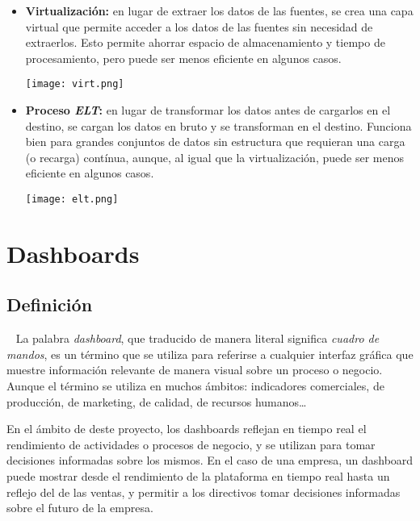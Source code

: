 \begin{itemize}
	\item \textbf{Virtualización:} en lugar de extraer los datos de las fuentes, se crea una capa virtual que
		permite acceder a los datos de las fuentes sin necesidad de extraerlos. Esto permite ahorrar espacio de
		almacenamiento y tiempo de procesamiento, pero puede ser menos eficiente en algunos casos.

		\begin{minipage}{0.9\linewidth}
			\texttt{[image: virt.png]}
		\end{minipage}
	\item \textbf{Proceso \textit{ELT}:} en lugar de transformar los datos antes de cargarlos en el destino,
		se cargan los datos en bruto y se transforman en el destino. Funciona bien para grandes conjuntos de
		datos sin estructura que requieran una carga (o recarga) contínua, aunque, al igual que la virtualización,
		puede ser menos eficiente en algunos casos.

		\begin{minipage}{0.9\linewidth}
			\texttt{[image: elt.png]}
		\end{minipage}
\end{itemize}


\newpage{}
\section{Dashboards}\label{sec:dashboards}
\subsection{Definición}~\cite{mier2023dashboards}
La palabra \textit{dashboard}, que traducido de manera literal significa \textit{cuadro de mandos},
es un término que se utiliza para referirse a cualquier interfaz gráfica que muestre información
relevante de manera visual sobre un proceso o negocio. Aunque el término se utiliza en
muchos ámbitos: indicadores comerciales, de producción, de marketing, de calidad, de recursos
humanos\ldots

En el ámbito de deste proyecto, los dashboards reflejan en tiempo real el rendimiento de
actividades o procesos de negocio, y se utilizan para tomar decisiones informadas sobre los
mismos. En el caso de una empresa, un dashboard puede mostrar desde el rendimiento de la
plataforma en tiempo real hasta un reflejo del de las ventas, y permitir a los directivos tomar
decisiones informadas sobre el futuro de la empresa.

